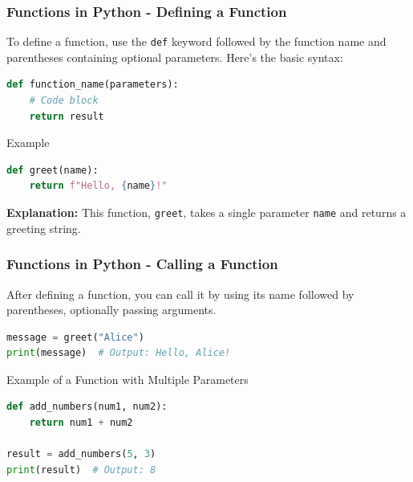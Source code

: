 \documentclass{beamer}
\begin{document}
\begin{frame}[fragile]
    \frametitle{Functions in Python - Defining a Function}
    To define a function, use the \texttt{def} keyword followed by the function name and parentheses containing optional parameters. Here's the basic syntax:

    \begin{lstlisting}[language=Python]
def function_name(parameters):
    # Code block
    return result
    \end{lstlisting}
    
    \begin{block}{Example}
        \begin{lstlisting}[language=Python]
def greet(name):
    return f"Hello, {name}!"
        \end{lstlisting}
        \textbf{Explanation:} This function, \texttt{greet}, takes a single parameter \texttt{name} and returns a greeting string.
    \end{block}
\end{frame}

\begin{frame}[fragile]
    \frametitle{Functions in Python - Calling a Function}
    After defining a function, you can call it by using its name followed by parentheses, optionally passing arguments.

    \begin{lstlisting}[language=Python]
message = greet("Alice")
print(message)  # Output: Hello, Alice!
    \end{lstlisting}

    \begin{block}{Example of a Function with Multiple Parameters}
        \begin{lstlisting}[language=Python]
def add_numbers(num1, num2):
    return num1 + num2

result = add_numbers(5, 3)
print(result)  # Output: 8
        \end{lstlisting}
    \end{block}
\end{frame}
\end{document}

